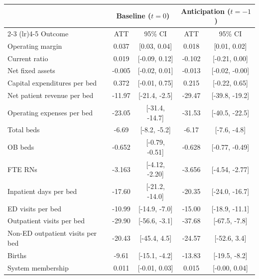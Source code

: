 \begin{tabular}[t]{lcccc}
\toprule
 & \multicolumn{2}{c}{Baseline ($t = 0$)} & \multicolumn{2}{c}{Anticipation ($t = -1$)} \\
\cmidrule(lr){2-3} \cmidrule(lr){4-5}
Outcome & ATT & 95\% CI & ATT & 95\% CI \\
\midrule
Operating margin & 0.037 & [0.03, 0.04] & 0.018 & [0.01, 0.02] \\
Current ratio & 0.019 & [-0.09, 0.12] & -0.102 & [-0.21, 0.00] \\
Net fixed assets & -0.005 & [-0.02, 0.01] & -0.013 & [-0.02, -0.00] \\
Capital expenditures per bed & 0.372 & [-0.01, 0.75] & 0.215 & [-0.22, 0.65] \\
Net patient revenue per bed & -11.97 & [-21.4, -2.5] & -29.47 & [-39.8, -19.2] \\
Operating expenses per bed & -23.05 & [-31.4, -14.7] & -31.53 & [-40.5, -22.5] \\
\addlinespace
Total beds & -6.69 & [-8.2, -5.2] & -6.17 & [-7.6, -4.8] \\
OB beds & -0.652 & [-0.79, -0.51] & -0.628 & [-0.77, -0.49] \\
FTE RNs & -3.163 & [-4.12, -2.20] & -3.656 & [-4.54, -2.77] \\
Inpatient days per bed & -17.60 & [-21.2, -14.0] & -20.35 & [-24.0, -16.7] \\
\addlinespace
ED visits per bed & -10.99 & [-14.9, -7.0] & -15.00 & [-18.9, -11.1] \\
Outpatient visits per bed & -29.90 & [-56.6, -3.1] & -37.68 & [-67.5, -7.8] \\
Non-ED outpatient visits per bed & -20.43 & [-45.4, 4.5] & -24.57 & [-52.6, 3.4] \\
Births & -9.61 & [-15.1, -4.2] & -13.83 & [-19.5, -8.2] \\
\addlinespace
System membership & 0.011 & [-0.01, 0.03] & 0.015 & [-0.00, 0.04] \\
\bottomrule
\end{tabular}

